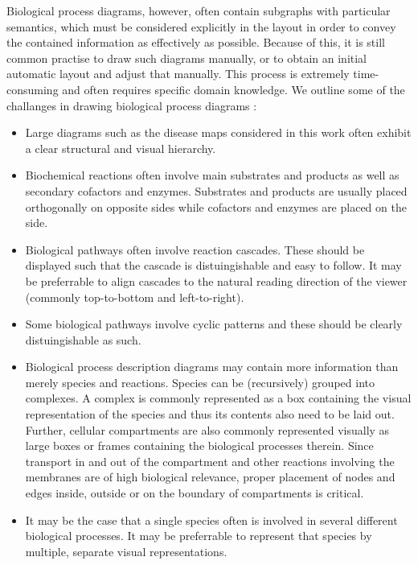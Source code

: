 \documentclass[
	fontsize=10pt, %
	twoside=false, %
	secnumdepth=1, %
  toc=indentunnumbered %
]{kaobook}
\begin{document}
Biological process diagrams, however, often contain subgraphs with particular
semantics, which must be considered explicitly in the layout in order to convey
the contained information as effectively as possible.
Because of this, it is still common practise to draw such diagrams manually,
or to obtain an initial automatic layout and adjust that manually. This process is
extremely time-consuming and often requires specific domain knowledge.
We outline some of the challanges in drawing biological process diagrams
\cite{bourqui_MetabolicNetworkVisualization_2007,
  siebenhaller_HumanlikeLayoutAlgorithms_2020,
  wu_MetabopolisScalableNetwork_2019}:


\begin{itemize}
 \item Large diagrams such as the disease maps considered in this work often
   exhibit a clear structural and visual hierarchy.
 \item Biochemical reactions often involve main substrates and products as well
   as secondary cofactors and enzymes. Substrates and products are usually
   placed orthogonally on opposite sides while cofactors and enzymes are
   placed on the side.
 \item Biological pathways often involve reaction cascades. These should be
   displayed such that the cascade is distuingishable and easy to follow.
   It may be preferrable to align cascades to the natural reading direction of
   the viewer (commonly top-to-bottom and left-to-right).
 \item Some biological pathways involve cyclic patterns and these should be
   clearly distuingishable as such.
\item Biological process description diagrams may contain more information
  than merely species and reactions. Species can be (recursively) grouped
  into complexes. A complex is commonly represented as a box containing the
  visual representation of the species and thus its contents also need to be
  laid out. Further, cellular compartments are also commonly represented
  visually as large boxes or frames containing the biological processes
  therein. Since transport in and out of the compartment and other reactions
  involving the membranes are of high biological relevance, proper placement
  of nodes and edges inside, outside or on the boundary of compartments is critical.
\item It may be the case that a single species often is involved in several
  different biological processes. It may be preferrable to represent that
  species by multiple, separate visual representations.
\end{itemize}
\end{document}
